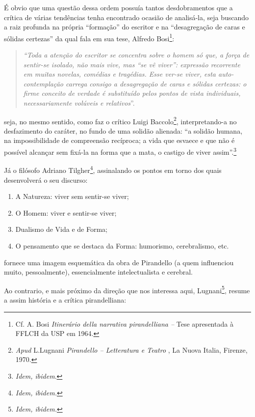 É obvio que uma questão dessa ordem possuía tantos desdobramentos que a
crítica de várias tendências tenha encontrado ocasião de analisá-la,
seja buscando a raiz profunda na própria ``formação'' do escritor e na
``desagregação de caras e sólidas certezas'' da qual fala em sua tese,
Alfredo Bosi\footnote{Cf. A. Bosi \emph{Itinerário della narrativa
  pirandelliana --} Tese apresentada à FFLCH da USP em 1964.}:

\begin{quote}
\emph{``Toda a atenção do escritor se concentra sobre o homem só que, a
força de sentir-se isolado, não mais vive, mas ``se vê viver'':
expressão recorrente em muitas novelas, comédias e tragédias. Esse
ver-se viver, esta auto-contemplação carrega consigo a desagregação de
caras e sólidas certezas: o firme conceito de verdade é substituído
pelos pontos de vista individuais, necessariamente volúveis e
relativos}''.
\end{quote}

seja, no mesmo sentido, como faz o crítico Luigi Baccolo\footnote{\emph{Apud}
  L.Lugnani \emph{Pirandello -- Letteratura e Teatro} , La Nuova Italia,
  Firenze, 1970.}, interpretando-a no desfazimento do caráter, no fundo
de uma solidão alienada: ``a solidão humana, na impossibilidade de
compreensão recíproca; a vida que esvaece e que não é possível alcançar
sem fixá-la na forma que a mata, o castigo de viver assim''.\footnote{\emph{Idem,
  ibidem}.}

Já o filósofo Adriano Tilgher\footnote{\emph{Idem, ibidem.}},
assinalando os pontos em torno dos quais desenvolverá o seu discurso:

\begin{enumerate}
\def\labelenumi{\arabic{enumi}.}
\item
  A Natureza: viver sem sentir-se viver;
\item
  O Homem: viver e sentir-se viver;
\item
  Dualismo de Vida e de Forma;
\item
  O pensamento que se destaca da Forma: humorismo, cerebralismo, etc.
\end{enumerate}

fornece uma imagem esquemática da obra de Pirandello (a quem influenciou
muito, pessoalmente), essencialmente intelectualista e cerebral.

Ao contrario, e mais próximo da direção que nos interessa aqui,
Lugnani\footnote{\emph{Idem, ibidem. }}, resume a assim história e a
crítica pirandelliana:

